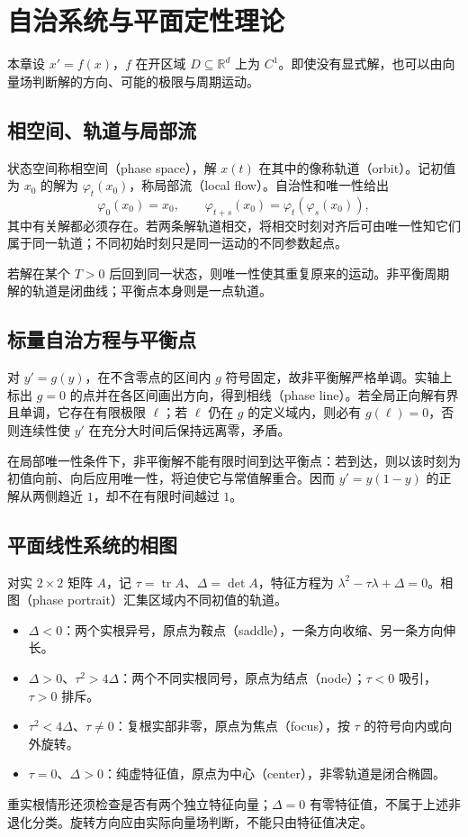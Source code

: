 \setcounter{chapter}{7} %
\chapter{自治系统与平面定性理论}
\label{chap:ode-phase-plane}

本章设 $x'=f(x)$，$f$ 在开区域 $D\subseteq\mathbb R^d$ 上为 $C^1$。即使没有显式解，也可以由向量场判断解的方向、可能的极限与周期运动。

\section{相空间、轨道与局部流}
状态空间称相空间（phase space），解 $x(t)$ 在其中的像称轨道（orbit）。记初值为 $x_0$ 的解为 $\varphi_t(x_0)$，称局部流（local flow）。自治性和唯一性给出
\[
 \varphi_0(x_0)=x_0,\qquad
 \varphi_{t+s}(x_0)=\varphi_t(\varphi_s(x_0)),
\]
其中有关解都必须存在。若两条解轨道相交，将相交时刻对齐后可由唯一性知它们属于同一轨道；不同初始时刻只是同一运动的不同参数起点。

若解在某个 $T>0$ 后回到同一状态，则唯一性使其重复原来的运动。非平衡周期解的轨道是闭曲线；平衡点本身则是一点轨道。

\section{标量自治方程与平衡点}
对 $y'=g(y)$，在不含零点的区间内 $g$ 符号固定，故非平衡解严格单调。实轴上标出 $g=0$ 的点并在各区间画出方向，得到相线（phase line）。若全局正向解有界且单调，它存在有限极限 $\ell$；若 $\ell$ 仍在 $g$ 的定义域内，则必有 $g(\ell)=0$，否则连续性使 $y'$ 在充分大时间后保持远离零，矛盾。

在局部唯一性条件下，非平衡解不能有限时间到达平衡点：若到达，则以该时刻为初值向前、向后应用唯一性，将迫使它与常值解重合。因而 $y'=y(1-y)$ 的正解从两侧趋近 $1$，却不在有限时间越过 $1$。

\section{平面线性系统的相图}
对实 $2\times2$ 矩阵 $A$，记 $\tau=\operatorname{tr}A$、$\Delta=\det A$，特征方程为 $\lambda^2-\tau\lambda+\Delta=0$。相图（phase portrait）汇集区域内不同初值的轨道。
\begin{itemize}
 \item $\Delta<0$：两个实根异号，原点为鞍点（saddle），一条方向收缩、另一条方向伸长。
 \item $\Delta>0$、$\tau^2>4\Delta$：两个不同实根同号，原点为结点（node）；$\tau<0$ 吸引，$\tau>0$ 排斥。
 \item $\tau^2<4\Delta$、$\tau\ne0$：复根实部非零，原点为焦点（focus），按 $\tau$ 的符号向内或向外旋转。
 \item $\tau=0$、$\Delta>0$：纯虚特征值，原点为中心（center），非零轨道是闭合椭圆。
\end{itemize}
重实根情形还须检查是否有两个独立特征向量；$\Delta=0$ 有零特征值，不属于上述非退化分类。旋转方向应由实际向量场判断，不能只由特征值决定。

